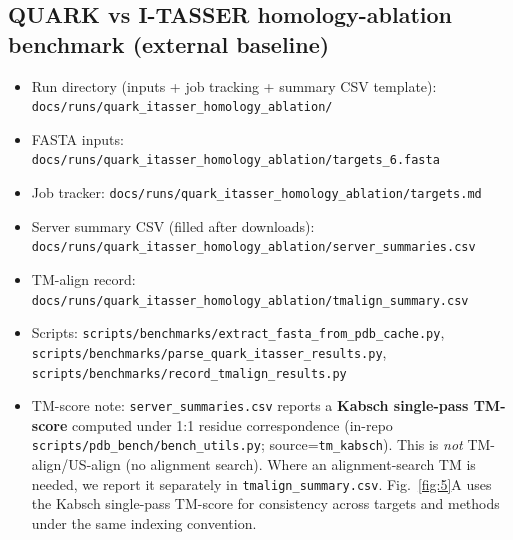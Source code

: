 \subsection*{QUARK vs I-TASSER homology-ablation benchmark (external baseline)}
\begin{itemize}
  \item Run directory (inputs + job tracking + summary CSV template): \texttt{docs/runs/quark\_itasser\_homology\_ablation/}
  \item FASTA inputs: \texttt{docs/runs/quark\_itasser\_homology\_ablation/targets\_6.fasta}
  \item Job tracker: \texttt{docs/runs/quark\_itasser\_homology\_ablation/targets.md}
  \item Server summary CSV (filled after downloads): \texttt{docs/runs/quark\_itasser\_homology\_ablation/server\_summaries.csv}
  \item TM-align record: \texttt{docs/runs/quark\_itasser\_homology\_ablation/tmalign\_summary.csv}
  \item Scripts: \texttt{scripts/benchmarks/extract\_fasta\_from\_pdb\_cache.py}, \texttt{scripts/benchmarks/parse\_quark\_itasser\_results.py}, \texttt{scripts/benchmarks/record\_tmalign\_results.py}
  \item TM-score note: \texttt{server\_summaries.csv} reports a \textbf{Kabsch single-pass TM-score} computed under 1:1 residue correspondence (in-repo \texttt{scripts/pdb\_bench/bench\_utils.py}; source=\texttt{tm\_kabsch}). This is \emph{not} TM-align/US-align (no alignment search). Where an alignment-search TM is needed, we report it separately in \texttt{tmalign\_summary.csv}. Fig.~\ref{fig:5}A uses the Kabsch single-pass TM-score for consistency across targets and methods under the same indexing convention.
\end{itemize}

